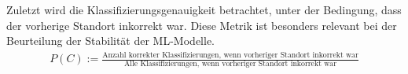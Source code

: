 Zuletzt wird die Klassifizierungsgenauigkeit betrachtet, unter der Bedingung, dass der vorherige Standort inkorrekt war.
Diese Metrik ist besonders relevant bei der Beurteilung der Stabilität der ML-Modelle.
\begin{align}
    \label{formular:accuracy_previous_was_in_correct}
    P(C) := \frac{\text{Anzahl korrekter Klassifizierungen, wenn vorheriger Standort inkorrekt war}}{\text{Alle Klassifizierungen, wenn vorheriger Standort inkorrekt war}}
\end{align}
